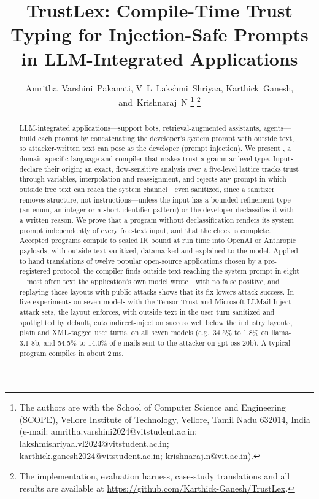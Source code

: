 \documentclass[journal]{IEEEtran}
\begin{document}
\title{TrustLex: Compile-Time Trust Typing for Injection-Safe Prompts in LLM-Integrated Applications}

\author{Amritha~Varshini~Pakanati, V~L~Lakshmi~Shriyaa, Karthick~Ganesh, and~Krishnaraj~N%
\thanks{The authors are with the School of Computer Science and Engineering (SCOPE), Vellore Institute of Technology, Vellore, Tamil Nadu 632014, India (e-mail: amritha.varshini2024@vitstudent.ac.in; lakshmishriyaa.vl2024@vitstudent.ac.in; karthick.ganesh2024@vitstudent.ac.in; krishnaraj.n@vit.ac.in).}%
\thanks{The implementation, evaluation harness, case-study translations and all results are available at \protect\url{https://github.com/Karthick-Ganesh/TrustLex}.}}


\maketitle

\begin{abstract}
LLM-integrated applications---support bots, retrieval-augmented assistants, agents---build each prompt by concatenating the developer's system prompt with outside text, so attacker-written text can pose as the developer (prompt injection). We present \TL{}, a domain-specific language and compiler that makes trust a grammar-level type. Inputs declare their origin; an exact, flow-sensitive analysis over a five-level lattice tracks trust through variables, interpolation and reassignment, and rejects any prompt in which outside free text can reach the system channel---even sanitized, since a sanitizer removes structure, not instructions---unless the input has a bounded refinement type (an enum, an integer or a short identifier pattern) or the developer declassifies it with a written reason. We prove that a program without declassification renders its system prompt independently of every free-text input, and that the check is complete. Accepted programs compile to sealed IR bound at run time into OpenAI or Anthropic payloads, with outside text sanitized, datamarked and explained to the model. Applied to hand translations of twelve popular open-source applications chosen by a pre-registered protocol, the compiler finds outside text reaching the system prompt in eight---most often text the application's own model wrote---with no false positive, and replaying those layouts with public attacks shows that its fix lowers attack success. In live experiments on seven models with the Tensor Trust and Microsoft LLMail-Inject attack sets, the layout \TL{} enforces, with outside text in the user turn sanitized and spotlighted by default, cuts indirect-injection success well below the industry layouts, plain and XML-tagged user turns, on all seven models (e.g.\ 34.5\% to 1.8\% on llama-3.1-8b, and 54.5\% to 14.0\% of e-mails sent to the attacker on gpt-oss-20b). A typical program compiles in about 2\,ms.
\end{abstract}
\end{document}
